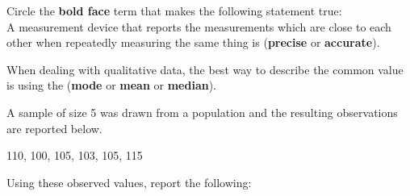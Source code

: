 \documentclass[addpoints]{examsetup}\usepackage[]{graphicx}\usepackage[]{color}
\begin{document}



\examCoverPage

\begin{questions}


\question[2] 
Circle the \textbf{bold face} term that makes the following statement true: \\

A measurement device that reports the measurements which are close to each other when repeatedly measuring the same thing is (\textbf{precise} or \textbf{accurate}).
\vspace{1cm}

\question[2] 
When dealing with qualitative data, the best way to describe the common value is using the (\textbf{mode} or \textbf{mean} or \textbf{median}).
\vspace{1cm}


\question


A sample of size 5 was drawn from a population and the resulting observations are reported below. 
\begin{center}
110, 100, 105, 103, 105, 115
\end{center}
Using these observed values, report the following:
\vspace{1cm}

\end{questions}
\end{document}
